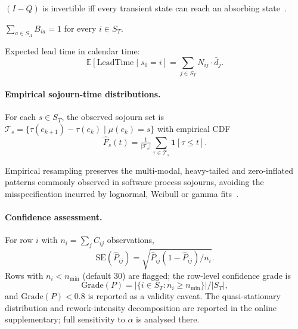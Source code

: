 \begin{property}[Invertibility]
\label{prop:invertibility}
$(I-Q)$ is invertible iff every transient state can reach an absorbing
state~\cite{kemeny1976finite}.
\end{property}

\begin{property}
\label{prop:absorption-certainty}
$\sum_{a \in S_A} B_{ia} = 1$ for every $i \in S_T$.
\end{property}

Expected lead time in calendar time:
\begin{equation}
\label{eq:expected-lead-time}
\mathbb{E}[\text{LeadTime} \mid s_0 = i]
  = \sum_{j \in S_T} N_{ij} \cdot \bar{d}_j.
\end{equation}

\paragraph{Empirical sojourn-time distributions.}
For each $s \in S_T$, the observed sojourn set is
$\mathcal{T}_s = \{\tau(e_{k+1}) - \tau(e_k) \mid \mu(e_k) = s\}$
with empirical CDF
\begin{equation}
\label{eq:ecdf}
\hat{F}_s(t) = \tfrac{1}{|\mathcal{T}_s|}
    \sum_{\tau \in \mathcal{T}_s} \mathbf{1}[\tau \leq t].
\end{equation}

\begin{remark}
\label{rem:nonparametric}
Empirical resampling preserves the multi-modal, heavy-tailed and
zero-inflated patterns commonly observed in software process
sojourns, avoiding the misspecification incurred by lognormal,
Weibull or gamma fits~\cite{vacanti2015}.
\end{remark}

\paragraph{Confidence assessment.}
For row $i$ with $n_i = \sum_j C_{ij}$ observations,
\begin{equation}
\label{eq:se-transition}
\text{SE}(\hat{P}_{ij}) = \sqrt{\hat{P}_{ij}(1 - \hat{P}_{ij}) / n_i}.
\end{equation}
Rows with $n_i < n_{\min}$ (default 30) are flagged; the row-level
confidence grade is
\begin{equation}
\label{eq:confidence-grade}
\text{Grade}(P) = |\{i \in S_T : n_i \geq n_{\min}\}| / |S_T|,
\end{equation}
and $\text{Grade}(P) < 0.8$ is reported as a validity caveat. The
quasi-stationary distribution and rework-intensity decomposition are
reported in the online supplementary; full sensitivity to $\alpha$ is
analysed there.

